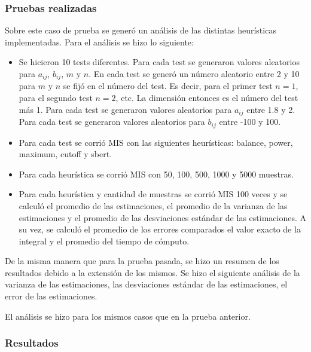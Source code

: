 \documentclass{article}
\begin{document}
\subsubsection{Pruebas realizadas}

Sobre este caso de prueba se generó un análisis de las distintas heurísticas implementadas.
Para el análisis se hizo lo siguiente:
\begin{itemize}
    \item Se hicieron 10 tests diferentes. Para cada test se generaron valores aleatorios para \( a_{ij} \), \( b_{ij} \), \( m \) y \( n \).
          En cada test se generó un número aleatorio entre 2 y 10 para \( m \) y \( n \) se fijó en el número del test.
          Es decir, para el primer test \( n = 1 \), para el segundo test \( n = 2 \), etc. La dimensión entonces es el número del test más 1.
          Para cada test se generaron valores aleatorios para \( a_{ij} \) entre 1.8 y 2.
          Para cada test se generaron valores aleatorios para \( b_{ij} \) entre -100 y 100.
    \item Para cada test se corrió MIS con las siguientes heurísticas: balance, power, maximum, cutoff y sbert.
    \item Para cada heurística se corrió MIS con 50, 100, 500, 1000 y 5000 muestras.
    \item Para cada heurística y cantidad de muestras se corrió MIS 100 veces y se calculó el promedio de las estimaciones,
          el promedio de la varianza de las estimaciones y el promedio de las desviaciones estándar de las estimaciones.
          A su vez, se calculó el promedio de los errores comparados el valor exacto de la integral y el promedio del tiempo de cómputo.
\end{itemize}

De la misma manera que para la prueba pasada, se hizo un resumen de los resultados debido a la extensión de los mismos.
Se hizo el siguiente análisis de la varianza de las estimaciones, las desviaciones estándar de las estimaciones, el error de las estimaciones.

El análisis se hizo para los mismos casos que en la prueba anterior.

\subsubsection{Resultados}
\end{document}
